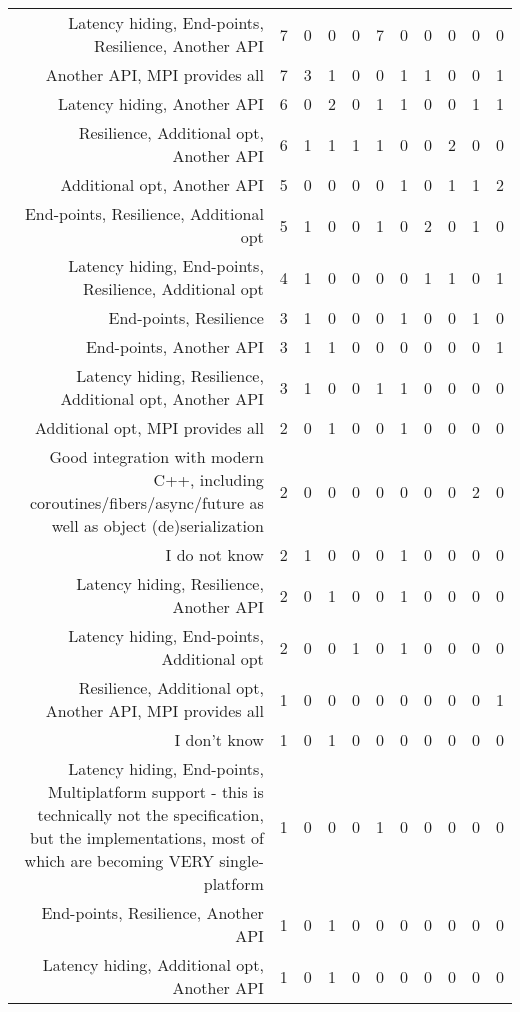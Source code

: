 {\begin{landscape}
\begin{longtable}[htb]{r|c|c|c|c|c|c|c|c|c|c}
{Latency hiding, End-points, Resilience, Another API} & 7 & 0 & 0 & 0 & 7 & 0 & 0 & 0 & 0 & 0 \\%
{Another API, MPI provides all} & 7 & 3 & 1 & 0 & 0 & 1 & 1 & 0 & 0 & 1 \\%
{Latency hiding, Another API} & 6 & 0 & 2 & 0 & 1 & 1 & 0 & 0 & 1 & 1 \\%
{Resilience, Additional opt, Another API} & 6 & 1 & 1 & 1 & 1 & 0 & 0 & 2 & 0 & 0 \\%
{Additional opt, Another API} & 5 & 0 & 0 & 0 & 0 & 1 & 0 & 1 & 1 & 2 \\%
{End-points, Resilience, Additional opt} & 5 & 1 & 0 & 0 & 1 & 0 & 2 & 0 & 1 & 0 \\%
{Latency hiding, End-points, Resilience, Additional opt} & 4 & 1 & 0 & 0 & 0 & 0 & 1 & 1 & 0 & 1 \\%
{End-points, Resilience} & 3 & 1 & 0 & 0 & 0 & 1 & 0 & 0 & 1 & 0 \\%
{End-points, Another API} & 3 & 1 & 1 & 0 & 0 & 0 & 0 & 0 & 0 & 1 \\%
{Latency hiding, Resilience, Additional opt, Another API} & 3 & 1 & 0 & 0 & 1 & 1 & 0 & 0 & 0 & 0 \\%
{Additional opt, MPI provides all} & 2 & 0 & 1 & 0 & 0 & 1 & 0 & 0 & 0 & 0 \\%
{Good integration with modern C++, including coroutines/fibers/async/future as well as object (de)serialization} & 2 & 0 & 0 & 0 & 0 & 0 & 0 & 0 & 2 & 0 \\%
{I do not know} & 2 & 1 & 0 & 0 & 0 & 1 & 0 & 0 & 0 & 0 \\%
{Latency hiding, Resilience, Another API} & 2 & 0 & 1 & 0 & 0 & 1 & 0 & 0 & 0 & 0 \\%
{Latency hiding, End-points, Additional opt} & 2 & 0 & 0 & 1 & 0 & 1 & 0 & 0 & 0 & 0 \\%
{Resilience, Additional opt, Another API, MPI provides all} & 1 & 0 & 0 & 0 & 0 & 0 & 0 & 0 & 0 & 1 \\%
{I don't know} & 1 & 0 & 1 & 0 & 0 & 0 & 0 & 0 & 0 & 0 \\%
{Latency hiding, End-points, Multiplatform support - this is technically not the specification, but the implementations, most of which are becoming VERY single-platform} & 1 & 0 & 0 & 0 & 1 & 0 & 0 & 0 & 0 & 0 \\%
{End-points, Resilience, Another API} & 1 & 0 & 1 & 0 & 0 & 0 & 0 & 0 & 0 & 0 \\%
{Latency hiding, Additional opt, Another API} & 1 & 0 & 1 & 0 & 0 & 0 & 0 & 0 & 0 & 0 \\%

\end{longtable}
\end{landscape}}
